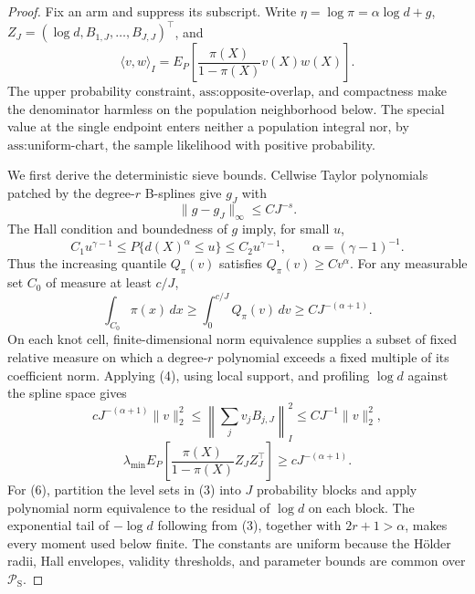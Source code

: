 \documentclass{article}
\begin{document}
\begin{proof}
Fix an arm and suppress its subscript.  Write \(\eta=\log\pi=\alpha\log d+g\),
\(Z_J=(\log d,B_{1,J},\ldots,B_{J,J})^\top\), and
\[
 \langle v,w\rangle_I=E_P\!\left[\frac{\pi(X)}{1-\pi(X)}v(X)w(X)\right].
\tag{1}
\]
The upper probability constraint, \(\text{ass:opposite-overlap}\), and compactness make the denominator harmless on the population neighborhood below.  The special value at the single endpoint enters neither a population integral nor, by \(\text{ass:uniform-chart}\), the sample likelihood with positive probability.

We first derive the deterministic sieve bounds.  Cellwise Taylor polynomials patched by the degree-\(r\) B-splines give \(g_J\) with
\[
 \|g-g_J\|_\infty\le C J^{-s}.
\tag{2}
\]
The Hall condition and boundedness of \(g\) imply, for small \(u\),
\[
 C_1u^{\gamma-1}\le P\{d(X)^\alpha\le u\}\le C_2u^{\gamma-1},
 \qquad \alpha=(\gamma-1)^{-1}.
\tag{3}
\]
Thus the increasing quantile \(Q_\pi(v)\) satisfies \(Q_\pi(v)\ge Cv^\alpha\).  For any measurable set \(C_0\) of measure at least \(c/J\),
\[
 \int_{C_0}\pi(x)\,dx\ge\int_0^{c/J}Q_\pi(v)\,dv\ge C J^{-(\alpha+1)}.
\tag{4}
\]
On each knot cell, finite-dimensional norm equivalence supplies a subset of fixed relative measure on which a degree-\(r\) polynomial exceeds a fixed multiple of its coefficient norm.  Applying (4), using local support, and profiling \(\log d\) against the spline space gives
\[
 cJ^{-(\alpha+1)}\|v\|_2^2
 \le\left\|\sum_jv_jB_{j,J}\right\|_I^2\le CJ^{-1}\|v\|_2^2,
\tag{5}
\]
\[
 \lambda_{\min}E_P\!\left[\frac{\pi(X)}{1-\pi(X)}Z_JZ_J^\top\right]
 \ge cJ^{-(\alpha+1)}.
\tag{6}
\]
For (6), partition the level sets in (3) into \(J\) probability blocks and apply polynomial norm equivalence to the residual of \(\log d\) on each block.  The exponential tail of \(-\log d\) following from (3), together with \(2r+1>\alpha\), makes every moment used below finite.  The constants are uniform because the Hölder radii, Hall envelopes, validity thresholds, and parameter bounds are common over \(\mathcal P_{\mathrm S}\).


\end{proof}
\end{document}
